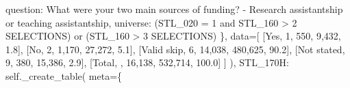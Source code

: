 \documentclass[
  11pt,
  a4paper,
]{article}
\newenvironment{Shaded}{\begin{snugshade}}{\end{snugshade}}
\newcommand{\NormalTok}[1]{\textcolor[rgb]{0.00,0.23,0.31}{#1}}
\newcommand{\OperatorTok}[1]{\textcolor[rgb]{0.37,0.37,0.37}{#1}}
\newcommand{\StringTok}[1]{\textcolor[rgb]{0.13,0.47,0.30}{#1}}
\newcommand{\VariableTok}[1]{\textcolor[rgb]{0.07,0.07,0.07}{#1}}
\begin{document}
\begin{Shaded}
\begin{Highlighting}[]
                    \StringTok{\textquotesingle{}question\textquotesingle{}}\NormalTok{: }\StringTok{\textquotesingle{}What were your two main sources of funding? {-} Research assistantship or teaching assistantship\textquotesingle{}}\NormalTok{,}
                    \StringTok{\textquotesingle{}universe\textquotesingle{}}\NormalTok{: }\StringTok{\textquotesingle{}(STL\_020 = 1 and STL\_160 \textgreater{} 2 SELECTIONS) or (STL\_160 \textgreater{} 3 SELECTIONS)\textquotesingle{}}
\NormalTok{                \},}
\NormalTok{                data}\OperatorTok{=}\NormalTok{[}
\NormalTok{                    [}\StringTok{\textquotesingle{}Yes\textquotesingle{}}\NormalTok{, }\StringTok{\textquotesingle{}1\textquotesingle{}}\NormalTok{, }\StringTok{\textquotesingle{}550\textquotesingle{}}\NormalTok{, }\StringTok{\textquotesingle{}9,432\textquotesingle{}}\NormalTok{, }\StringTok{\textquotesingle{}1.8\textquotesingle{}}\NormalTok{],}
\NormalTok{                    [}\StringTok{\textquotesingle{}No\textquotesingle{}}\NormalTok{, }\StringTok{\textquotesingle{}2\textquotesingle{}}\NormalTok{, }\StringTok{\textquotesingle{}1,170\textquotesingle{}}\NormalTok{, }\StringTok{\textquotesingle{}27,272\textquotesingle{}}\NormalTok{, }\StringTok{\textquotesingle{}5.1\textquotesingle{}}\NormalTok{],}
\NormalTok{                    [}\StringTok{\textquotesingle{}Valid skip\textquotesingle{}}\NormalTok{, }\StringTok{\textquotesingle{}6\textquotesingle{}}\NormalTok{, }\StringTok{\textquotesingle{}14,038\textquotesingle{}}\NormalTok{, }\StringTok{\textquotesingle{}480,625\textquotesingle{}}\NormalTok{, }\StringTok{\textquotesingle{}90.2\textquotesingle{}}\NormalTok{],}
\NormalTok{                    [}\StringTok{\textquotesingle{}Not stated\textquotesingle{}}\NormalTok{, }\StringTok{\textquotesingle{}9\textquotesingle{}}\NormalTok{, }\StringTok{\textquotesingle{}380\textquotesingle{}}\NormalTok{, }\StringTok{\textquotesingle{}15,386\textquotesingle{}}\NormalTok{, }\StringTok{\textquotesingle{}2.9\textquotesingle{}}\NormalTok{],}
\NormalTok{                    [}\StringTok{\textquotesingle{}Total\textquotesingle{}}\NormalTok{, }\StringTok{\textquotesingle{}\textquotesingle{}}\NormalTok{, }\StringTok{\textquotesingle{}16,138\textquotesingle{}}\NormalTok{, }\StringTok{\textquotesingle{}532,714\textquotesingle{}}\NormalTok{, }\StringTok{\textquotesingle{}100.0\textquotesingle{}}\NormalTok{]}
\NormalTok{                ]}
\NormalTok{            ),}
            \StringTok{\textquotesingle{}STL\_170H\textquotesingle{}}\NormalTok{: }\VariableTok{self}\NormalTok{.\_create\_table(}
\NormalTok{                meta}\OperatorTok{=}\NormalTok{\{}

\end{Highlighting}
\end{Shaded}
\end{document}
